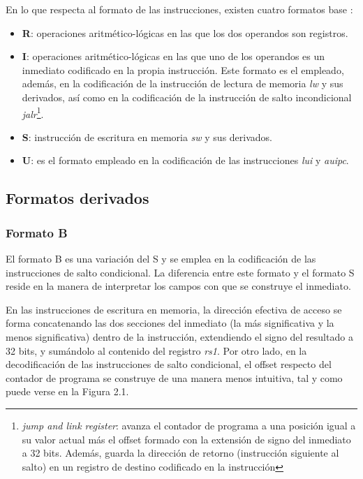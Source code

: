 En lo que respecta al formato de las instrucciones, existen cuatro formatos base \cite{riscv-unpriv-isa-20250508-unpriv-isa-base-instr-formats}:

\begin{itemize}
  \item \textbf{R}: operaciones aritmético-lógicas en las que los dos operandos son registros.
  \vspace{-0.2cm}
  \item \textbf{I}: operaciones aritmético-lógicas en las que uno de los operandos es un inmediato codificado en la propia instrucción. Este formato es el empleado, además, en la codificación de la instrucción de lectura de memoria \textit{lw} y sus derivados, así como en la codificación de la instrucción de salto incondicional \textit{jalr}\footnote{\textit{jump and link register}: avanza el contador de programa a una posición igual a su valor actual más el offset formado con la extensión de signo del inmediato a 32 bits. Además, guarda la dirección de retorno (instrucción siguiente al salto) en un registro de destino codificado en la instrucción}.
  \vspace{-0.2cm}
  \item \textbf{S}: instrucción de escritura en memoria \textit{sw} y sus derivados.
  \vspace{-0.2cm}
  \item \textbf{U}: es el formato empleado en la codificación de las instrucciones \textit{lui} y \textit{auipc}.
\end{itemize}

\subsection{Formatos derivados}

\subsubsection{Formato B}

El formato B es una variación del S y se emplea en la codificación de las instrucciones de salto condicional. La diferencia entre este formato y el formato S reside en la manera de interpretar los campos con que se construye el inmediato.

En las instrucciones de escritura en memoria, la dirección efectiva de acceso se forma concatenando las dos secciones del inmediato (la más significativa y la menos significativa) dentro de la instrucción, extendiendo el signo del resultado a 32 bits, y sumándolo al contenido del registro \textit{rs1}. Por otro lado, en la decodificación de las instrucciones de salto condicional, el offset respecto del contador de programa se construye de una manera menos intuitiva, tal y como puede verse en la Figura 2.1.

